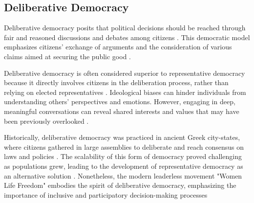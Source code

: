 \documentclass{IEEEtran}
\begin{document}
\subsection{Deliberative Democracy}

Deliberative democracy posits that political decisions should be reached through fair and reasoned discussions and debates among citizens \cite{gutmann1996deliberative}. This democratic model emphasizes citizens' exchange of arguments and the consideration of various claims aimed at securing the public good \cite{elstub2010handbook}.

Deliberative democracy is often considered superior to representative democracy because it directly involves citizens in the deliberation process, rather than relying on elected representatives \cite{mansbridge1999everyday}. Ideological biases can hinder individuals from understanding others' perspectives and emotions. However, engaging in deep, meaningful conversations can reveal shared interests and values that may have been previously overlooked \cite{bachtiger2018deliberative}.

Historically, deliberative democracy was practiced in ancient Greek city-states, where citizens gathered in large assemblies to deliberate and reach consensus on laws and policies \cite{ober1998polis}. The scalability of this form of democracy proved challenging as populations grew, leading to the development of representative democracy as an alternative solution \cite{manin1997principles}. Nonetheless, the modern leaderless movement "Women Life Freedom" embodies the spirit of deliberative democracy, emphasizing the importance of inclusive and participatory decision-making processes 

\end{document}
